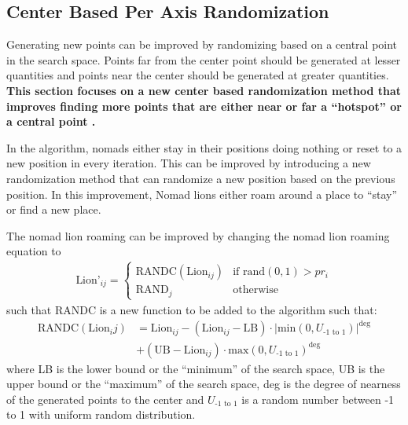 \subsection{Center Based Per Axis Randomization}
\par Generating new points can be improved by randomizing based on a central point in the search space. Points far from the center point should be generated at lesser quantities and points near the center should be generated at greater quantities. \textbf{This section focuses on a new center based randomization method that improves finding more points that are either near or far a ``hotspot'' or a central point \cite{strategy}.}

\par In the algorithm, nomads either stay in their positions doing nothing or reset to a new position in every iteration. This can be improved by introducing a new randomization method that can randomize a new position based on the previous position. In this improvement, Nomad lions either roam around a place to ``stay'' or find a new place.

\par The nomad lion roaming can be improved by changing the nomad lion roaming equation to
\begin{align*}
 \text{Lion'}_{ij} =
  \begin{cases}
   \text{RANDC}(\text{Lion}_{ij})        & \text{if rand}(0,1)  > pr_i \\
   \text{RAND}_j        & \text{otherwise}
 \end{cases}
\end{align*}
such that RANDC is a new function to be added to the algorithm such that:
\begin{align*}
\text{RANDC}(\text{Lion}_ij) &= \text{Lion}_{ij} - (\text{Lion}_{ij} - \text{LB}) \cdot |\text{min}(0, U_\text{-1 to 1})|^\text{deg} \\
 & + (\text{UB} - \text{Lion}_{ij}) \cdot \text{max}(0, U_\text{-1 to 1})^{\text{deg}}
\end{align*}
where LB is the lower bound or the ``minimum'' of the search space, UB is the upper bound or the ``maximum'' of the search space, deg is the degree of nearness of the generated points to the center and $U_\text{-1 to 1}$ is a random number between -1 to 1 with uniform random distribution.

